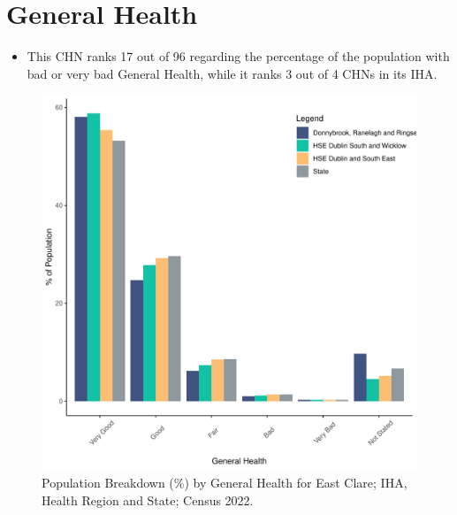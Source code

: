 \documentclass{article}
\begin{document}
\pagebreak

\section{General Health}\label{sect:GenHealth}
\begin{itemize}
\item  This CHN ranks  17 out of 96 regarding the percentage of the population with bad or very bad General Health, while it ranks   3 out of 4 CHNs in its IHA.
\end{itemize}
\begin{figure}[h]
	\centering
	\includegraphics[width = 150mm]{../figures/GenED.pdf}
	\caption{Population Breakdown (\%) by General Health for East Clare; IHA, Health Region and State;  Census 2022.}
	\label{fig:2ae19629-1a6a-13a3-e055-000000000001}
	\end{figure}
\end{document}
